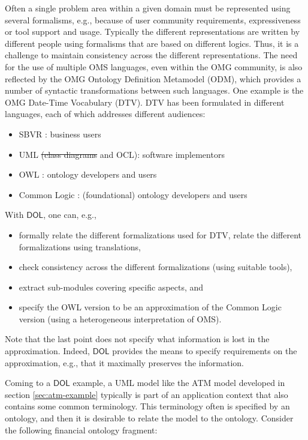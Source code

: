 \documentclass[10pt,fleqn,final]{scrreprt}
\newcommand*{\DOL}{\ensuremath{\mathsf{DOL}}\xspace}
\newcommand{\noterefname}{note}
\newcommand{\nref}[1]{\noterefname~\ref{#1}}
\renewcommand{\nref}[1]{\ref{nref-#1}} %
\newenvironment{definitions}[0]{\medskip }{}
\providecommand{\DIFadd}[1]{{\protect\color{blue}\uwave{#1}}} %
\providecommand{\DIFdel}[1]{{\protect\color{red}\sout{#1}}}                      %
\providecommand{\DIFaddbegin}{} %
\providecommand{\DIFaddend}{} %
\providecommand{\DIFdelbegin}{} %
\providecommand{\DIFdelend}{} %
\begin{document}
\begin{definitions}
Often a single problem area within a given domain must be represented using several formalisms, e.g., because of user community requirements, expressiveness or tool support 
and usage. 
Typically the different representations are written by different people using formalisms that are based on different logics. Thus, it is a challenge to maintain 
consistency across the different representations. 
The need for the use of multiple OMS languages, even within the OMG community, is also reflected by the OMG Ontology Definition Metamodel (ODM\DIFaddbegin \DIFadd{, \nref{ODM}}\DIFaddend ), which 
provides a number of syntactic transformations between such languages.
One example is the OMG Date-Time Vocabulary (DTV\DIFaddbegin \DIFadd{, \nref{DTV}}\DIFaddend ). DTV has been formulated in different languages, each of which addresses different audiences:
\begin{itemize}
\item	 SBVR \DIFaddbegin \DIFadd{\nref{SBVR}}\DIFaddend : business users
\item 	UML \DIFdelbegin \DIFdel{(class diagrams }\DIFdelend \DIFaddbegin \DIFadd{\nref{UML} (class models }\DIFaddend and OCL): software implementors
\item 	OWL \DIFaddbegin \DIFadd{\nref{OWL2}}\DIFaddend : ontology developers and users
\item 	Common Logic \DIFaddbegin \DIFadd{\nref{CL}}\DIFaddend : (foundational) ontology developers and users
\end{itemize}
With \DOL, one can, e.g.,
\begin{itemize}
\item 	formally relate the different formalizations used for DTV, relate the different formalizations using translations,
\item 	check consistency across the different formalizations (using suitable tools),
\item 	extract sub-modules covering specific aspects, and
\item 	specify the OWL version to be an approximation of the Common Logic version (using a heterogeneous interpretation of OMS).
\end{itemize}
Note that the last point does not specify what information is lost in the approximation. Indeed, \DOL provides the means to specify requirements on the approximation, e.g., that it maximally preserves the information. 

Coming to a \DOL example,
a UML model like the ATM model developed in section \ref{sec:atm-example} typically is part of an
application context that also contains some common terminology.
This terminology often is specified by an ontology, and then
it is desirable to relate the model to the ontology. Consider
the following financial ontology fragment:


\end{definitions}
\end{document}
